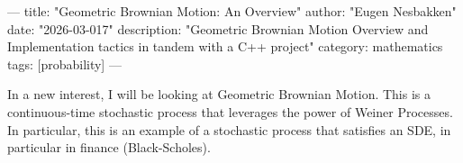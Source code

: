 ---
title: "Geometric Brownian Motion: An Overview"
author: "Eugen Nesbakken"
date: "2026-03-017"
description: "Geometric Brownian Motion Overview and Implementation tactics in tandem with a C++ project"
category: mathematics
tags: [probability]
---

In a new interest, I will be looking at Geometric Brownian Motion. This is a continuous-time stochastic process that leverages the power of Weiner Processes. 
In particular, this is an example of a stochastic process that satisfies an SDE, in particular in finance (Black-Scholes). 


